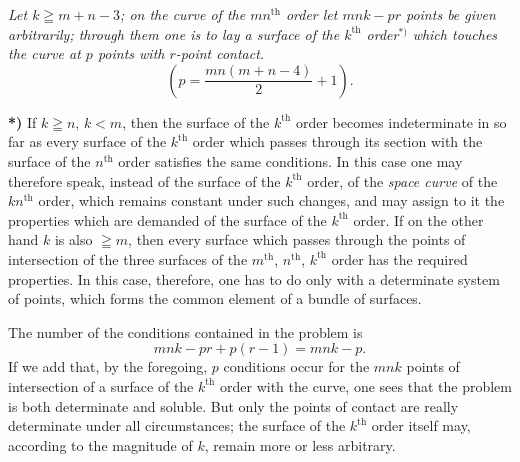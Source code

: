 \documentclass{article}
\begin{document}
\emph{Let $k\geqq m+n-3$; on the curve of the $mn^{\text{th}}$ order let $mnk-pr$ points be given arbitrarily; through them one is to lay a surface of the $k^{\text{th}}$ order}${}^{*)}$ \emph{which touches the curve at $p$ points with $r$-point contact.}
\[
\left(p=\frac{mn(m+n-4)}{2}+1\right).
\]

\textbf{*)} If $k\geqq n$, $k<m$, then the surface of the $k^{\text{th}}$ order becomes indeterminate in so far as every surface of the $k^{\text{th}}$ order which passes through its section with the surface of the $n^{\text{th}}$ order satisfies the same conditions. In this case one may therefore speak, instead of the surface of the $k^{\text{th}}$ order, of the \emph{space curve} of the $kn^{\text{th}}$ order, which remains constant under such changes, and may assign to it the properties which are demanded of the surface of the $k^{\text{th}}$ order. If on the other hand $k$ is also $\geqq m$, then every surface which passes through the points of intersection of the three surfaces of the $m^{\text{th}}$, $n^{\text{th}}$, $k^{\text{th}}$ order has the required properties. In this case, therefore, one has to do only with a determinate system of points, which forms the common element of a bundle of surfaces.


The number of the conditions contained in the problem is
\[
mnk-pr+p(r-1) = mnk-p.
\]
If we add that, by the foregoing, $p$ conditions occur for the $mnk$ points of intersection of a surface of the $k^{\text{th}}$ order with the curve, one sees that the problem is both determinate and soluble. But only the points of contact are really determinate under all circumstances; the surface of the $k^{\text{th}}$ order itself may, according to the magnitude of $k$, remain more or less arbitrary.
\end{document}
